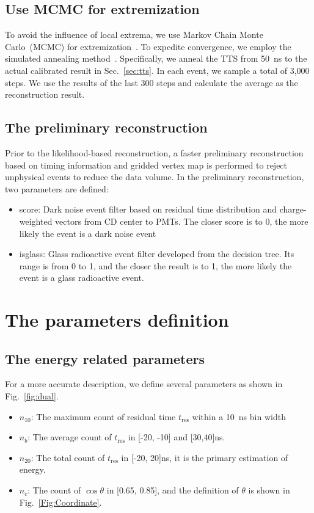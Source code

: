 \subsection{Use MCMC for extremization}
To avoid the influence of local extrema, we use Markov Chain Monte Carlo~(MCMC) for extremization~\cite{MCMC}.
To expedite convergence, we employ the simulated annealing method~\cite{prefit}. Specifically, we anneal the TTS from \SI{50}{ns} to the actual calibrated result in Sec.~\ref{sec:tts}.
In each event, we sample a total of 3,000 steps. We use the results of the last 300 steps and calculate the average as the reconstruction result.

\subsection{The preliminary reconstruction}
Prior to the likelihood-based reconstruction, a faster preliminary reconstruction based on timing information and gridded vertex map is performed to reject unphysical events to  reduce the data volume. In the preliminary reconstruction, two parameters are defined:
\begin{itemize}
	\item score: Dark noise event filter based on residual time distribution and charge-weighted vectors from CD center to PMTs. The closer score is to 0, the more likely the event is a dark noise event
	\item isglass: Glass radioactive event filter developed from the decision tree. Its range is from 0 to 1, and the closer the result is to 1, the more likely the event is a glass radioactive event.
\end{itemize}

\section{The parameters definition}
\subsection{The energy related parameters}
For a more accurate description, we define several parameters as shown in Fig.~\ref{fig:dual}.
\begin{itemize}
	\item $n_{10}$: The maximum count of residual time $t_{\mathrm{res}}$ within a
	      \SI{10}{\nano s} bin width
	\item $n_{b}$: The average count of $t_{\mathrm{res}}$ in [-20, -10] and
		      [30,40]\si{\nano s}.
	\item $n_{20}$: The total count of $t_{\mathrm{res}}$ in [-20, 20]\si{\nano s},
	      it is the primary estimation of energy.
	\item $n_c$: The count of $\cos\theta$ in [0.65, 0.85], and the definition of $\theta$ is shown in Fig.~\ref{Fig:Coordinate}.
\end{itemize}

